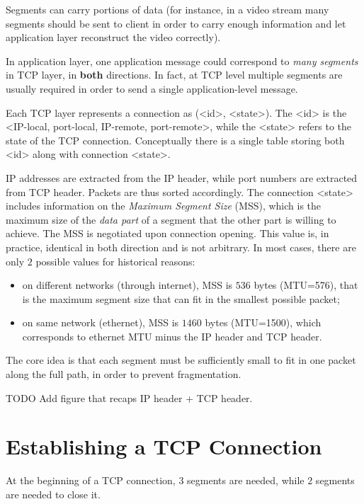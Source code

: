 \documentclass[a4paper, 12pt]{report}
\begin{document}
Segments can carry portions of data (for instance, in a video stream many
segments should be sent to client in order to carry enough information and let
application layer reconstruct the video correctly).

In application layer, one application message could correspond to \emph{many
segments} in TCP layer, in \textbf{both} directions. In fact, at TCP level
multiple segments are usually required in order to send a single
application-level message.

Each TCP layer represents a connection as (<id>, <state>). The <id> is the
<IP-local, port-local, IP-remote, port-remote>, while the <state> refers to the
state of the TCP connection. Conceptually there is a single table storing both
<id> along with connection <state>.

IP addresses are extracted from the IP header, while port numbers are extracted
from TCP header. Packets are thus sorted accordingly. The connection <state>
includes information on the \emph{Maximum Segment Size} (MSS), which is the
maximum size of the \emph{data part} of a segment that the other part is
willing to achieve. The MSS is negotiated upon connection opening. This value
is, in practice, identical in both direction and is not arbitrary. In most
cases, there are only $2$ possible values for historical reasons:

\begin{itemize}
	\item on different networks (through internet), MSS is $536$ bytes (MTU=576),
		that is the maximum segment size that can fit in the smallest
		possible packet;
	\item on same network (ethernet), MSS is $1460$ bytes (MTU=1500), which
		corresponds to ethernet MTU minus the IP header and TCP header.
\end{itemize}

The core idea is that each segment must be sufficiently small to fit in one
packet along the full path, in order to prevent fragmentation.

TODO Add figure that recaps IP header + TCP header.

\section{Establishing a TCP Connection}

At the beginning of a TCP connection, $3$ segments are needed, while $2$ segments are needed to close it.
\end{document}
